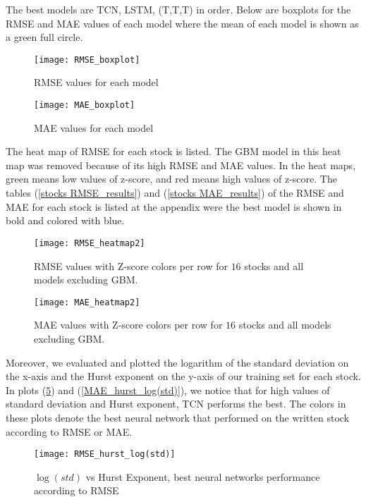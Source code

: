 \documentclass[12pt, A4]{article}
\begin{document}
The best models are TCN, LSTM, (T,T,T) in order. Below are boxplots for the RMSE and MAE values of each model where the mean of each model is shown as a green full circle.

\begin{figure}[H]
	\centering
	\texttt{[image: RMSE\_boxplot]}
	\caption{RMSE values for each model}
	\label{RMSE_boxplot}
\end{figure}

\begin{figure}[H]
	\centering
	\texttt{[image: MAE\_boxplot]}
	\caption{MAE values for each model}
	\label{MAE_boxplot}
\end{figure}


The heat map of RMSE for each stock is listed. The GBM model in this heat map was removed because of its high RMSE and MAE values. In the heat maps, green means low values of z-score, and red means high values of z-score. The tables (\ref{stocks RMSE_results}) and (\ref{stocks MAE_results}) of the RMSE and MAE for each stock is listed at the appendix were the best model is shown in bold and colored with blue.

\begin{figure}[H]
	\centering
	\texttt{[image: RMSE\_heatmap2]}
	\caption{RMSE values with Z-score colors per row for $16$ stocks and all models excluding GBM.}
	\label{RMSE_heatmap}
\end{figure}

\begin{figure}[H]
	\centering
	\texttt{[image: MAE\_heatmap2]}
	\caption{MAE values with Z-score colors per row for $16$ stocks and all models excluding GBM.}
	\label{MAE_heatmap}
\end{figure}

Moreover, we evaluated and plotted the logarithm of the standard deviation on the x-axis and the Hurst exponent on the y-axis of our training set for each stock. In plots (\ref{RMSE_hurst_log(std)}) and (\ref{MAE_hurst_log(std)}), we notice that for high values of standard deviation and Hurst exponent, TCN performs the best. The colors in these plots denote the best neural network that performed on the written stock according to RMSE or MAE.

\begin{figure}[H]
	\centering
	\texttt{[image: RMSE\_hurst\_log(std)]}
	\caption{$\log(std)$ vs Hurst Exponent, best neural networks performance according to RMSE}
	\label{RMSE_hurst_log(std)}
\end{figure}
\end{document}
